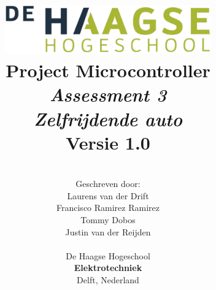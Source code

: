 \title{
\includegraphics[width=3.5in]{Media/Figuren/HHS.png} \\
\vspace*{2in}
\textbf{Project Microcontroller}\\
\textit{Assessment 3}\\
\textit{Zelfrijdende auto}\\
Versie 1.0
}
\author{
\vspace*{1.5in} \\
  Geschreven door:\\
  Laurens van der Drift\\
  Francisco Ramirez Ramirez\\
  Tommy Dobos\\
  Justin van der Reijden\\
		\vspace*{0.5in} \\
		De Haagse Hogeschool\\
        \textbf{Elektrotechniek}\\
        Delft, Nederland
       } 